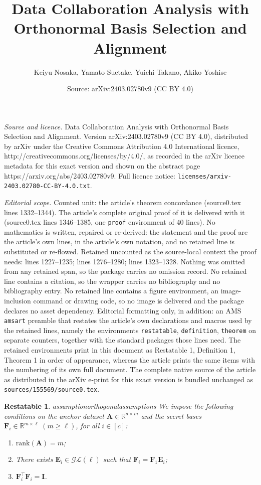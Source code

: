 \documentclass[10pt,a4paper]{amsart}
\title{Data Collaboration Analysis with Orthonormal Basis Selection and Alignment}
\author{Keiyu Nosaka, Yamato Suetake, Yuichi Takano, Akiko Yoshise}
\date{Source: arXiv:2403.02780v9 (CC BY 4.0)}
\newtheorem{restatable}{Restatable}
\newcommand{\matr}[1]{\bm{#1}}        %
\begin{document}
\maketitle

\noindent\emph{Source and licence.} Data Collaboration Analysis with Orthonormal Basis Selection and Alignment. Version arXiv:2403.02780v9 (CC BY 4.0), distributed by arXiv under the Creative Commons Attribution 4.0 International licence, http://creativecommons.org/licenses/by/4.0/, as recorded in the arXiv licence metadata for this exact version and shown on the abstract page https://arxiv.org/abs/2403.02780v9. Full licence notice: \texttt{licenses/arxiv-2403.02780-CC-BY-4.0.txt}.\par\smallskip

\noindent\textit{Editorial scope.} Counted unit: the article's theorem concordance (source0.tex lines 1332--1344). The article's complete original proof of it is delivered with it (source0.tex lines 1346--1385, one \texttt{proof} environment of 40 lines). No mathematics is written, repaired or re-derived: the statement and the proof are the article's own lines, in the article's own notation, and no retained line is substituted or re-flowed.  Retained uncounted as the source-local context the proof needs: lines 1227--1235; lines 1276--1280; lines 1323--1328.  Nothing was omitted from any retained span, so the package carries no omission record.  No retained line contains a citation, so the wrapper carries no bibliography and no bibliography entry.  No retained line contains a figure environment, an image-inclusion command or drawing code, so no image is delivered and the package declares no asset dependency.  Editorial formatting only, in addition: an AMS \texttt{amsart} preamble that restates the article's own declarations and macros used by the retained lines, namely the environments \texttt{restatable}, \texttt{definition}, \texttt{theorem} on separate counters, together with the standard packages those lines need.  The retained environments print in this document as Restatable 1, Definition 1, Theorem 1 in order of appearance, whereas the article prints the same items with the numbering of its own full document.  The complete native source of the article as distributed in the arXiv e-print for this exact version is bundled unchanged as \texttt{sources/155569/source0.tex}.
\begin{restatable}{assumption}{orthogonalassumptions}
    \label{assumptions: ODC}
    We impose the following conditions on the anchor dataset \( \matr{A} \in \mathbb{R}^{a \times m} \) and the secret bases \( \matr{F}_i \in \mathbb{R}^{m \times \ell} \; (m \geq \ell) \), for all \(i \in [c]\):
    \begin{enumerate}[label=\arabic*)]
        \item \( \mathrm{rank}(\matr{A}) = m \);
        \item There exists \( \matr{E}_i \in \mathcal{GL}(\ell) \) such that \( \matr{F}_i = \matr{F}_1\matr{E}_i \);
        \item \(\matr{F}_i^\top \matr{F}_i = \matr{I}\).
    \end{enumerate}
\end{restatable}
\end{document}
